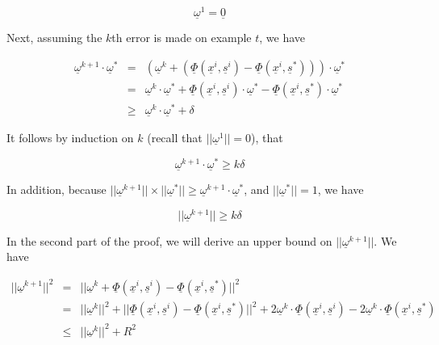 \documentclass[12pt]{article}
\begin{document}
\begin{equation*}
\underline {\omega}^1 = \underline {0}
\end{equation*}

Next, assuming the $k$th error is made on example $t$, we have

\begin{eqnarray*}
\underline {\omega}^{k+1} \cdot \underline {\omega}^*
&=& (\underline {\omega}^k + (\underline {\Phi} (\underline {x}^i,
\underline {s}^i) - \underline {\Phi} (\underline {x}^i, \underline
{s}^*))) \cdot \underline {\omega}^* \\
&=& \underline {\omega}^k \cdot \underline {\omega}^* + \underline
{\Phi} (\underline {x}^i, \underline {s}^i) \cdot \underline
{\omega}^* - \underline {\Phi} (\underline {x}^i, \underline {s}^*)
\cdot \underline {\omega}^* \\ 
&\ge& \underline {\omega}^k \cdot \underline {\omega}^* + \delta
\end{eqnarray*}

It follows by induction on $k$ (recall that $||\underline {\omega}^1||
=0$), that 

\begin{equation*}
\underline {\omega}^{k+1} \cdot \underline {\omega}^* \ge k \delta
\end{equation*}

In addition, because $||\underline {\omega}^{k+1}|| \times
||\underline {\omega}^*|| \ge \underline {\omega}^{k+1} \cdot
\underline {\omega}^*$, and $||\underline {\omega}^*|| = 1$, we have

\begin{equation*}
||\underline {\omega}^{k+1}|| \ge k \delta
\end{equation*}

In the second part of the proof, we will derive an upper bound on
$||\underline {\omega}^{k+1}||$. We have

\begin{eqnarray*}
||\underline {\omega}^{k+1}||^2
&=& ||\underline {\omega}^k + \underline {\Phi} (\underline {x}^i,
\underline {s}^i) - \underline {\Phi} (\underline {x}^i, \underline
{s}^*) ||^2 \\
&=& ||\underline {\omega}^k||^2 + || \underline {\Phi} (\underline {x}^i,
\underline {s}^i) - \underline {\Phi} (\underline {x}^i, \underline
{s}^*) ||^2 + 2 \underline {\omega}^k \cdot \underline {\Phi}
(\underline {x}^i, \underline {s}^i) - 2 \underline {\omega}^k \cdot
\underline {\Phi} (\underline {x}^i, \underline {s}^*) \\
&\le& ||\underline {\omega}^k||^2 + R^2
\end{eqnarray*}
\end{document}
